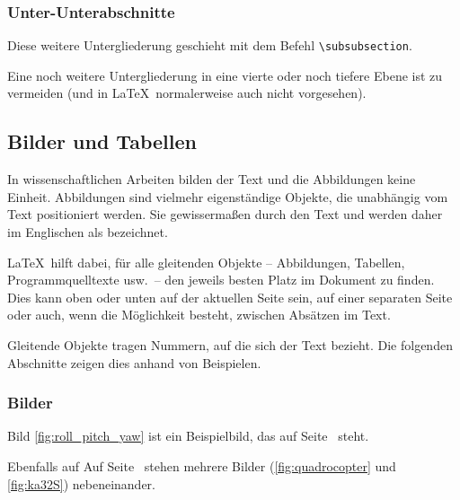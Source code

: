 \subsubsection{Unter-Unterabschnitte%
               \label{sec:Unter-Unterabschnitte}}

Diese weitere Untergliederung geschieht mit dem Befehl \lstinline|\subsubsection|.

Eine noch weitere Untergliederung in eine vierte oder noch tiefere Ebene ist zu
vermeiden (und in \LaTeX\ normalerweise auch nicht vorgesehen).
 
\subsection{Bilder und Tabellen%
            \label{sec:Bilder-Tabellen}}

In wissenschaftlichen Arbeiten bilden der Text und die Abbildungen keine Einheit.
Abbildungen sind vielmehr eigenständige Objekte, die unabhängig vom Text positioniert werden.
Sie \grqq{} gewissermaßen durch den Text
und werden daher im Englischen als \grqq{} bezeichnet.

\LaTeX\ hilft dabei, für alle gleitenden Objekte
-- Abbildungen, Tabellen, Programmquelltexte usw.\ -- 
den jeweils besten Platz im Dokument zu finden.
Dies kann oben oder unten auf der aktuellen Seite sein,
auf einer separaten Seite oder auch, wenn die Möglichkeit besteht,
zwischen Absätzen im Text.

Gleitende Objekte tragen Nummern, auf die sich der Text bezieht.
Die folgenden Abschnitte zeigen dies anhand von Beispielen.

\subsubsection{Bilder%
               \label{sec:Bilder}}

Bild \ref{fig:roll_pitch_yaw} ist ein Beispielbild,
das auf Seite~\pageref{fig:roll_pitch_yaw} steht.

%
%
\ifthenelse{\equal{\pageref{fig:roll_pitch_yaw}}{\pageref{fig:quadrocopter}}}%
           {Ebenfalls auf}%
           {Auf}
Seite~\pageref{fig:quadrocopter} stehen mehrere Bilder
(\ref{fig:quadrocopter} und \ref{fig:ka32S}) nebeneinander.

